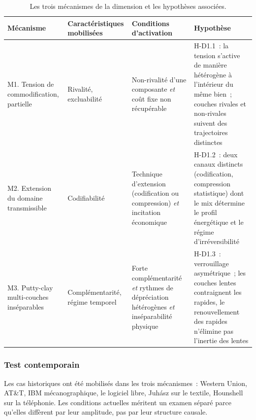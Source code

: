 \begin{table}[htbp]
\caption{Les trois mécanismes de la dimension et les hypothèses associées.}\label{tab:d1-mecanismes}
\centering\footnotesize
\renewcommand{\arraystretch}{1.25}
\begin{tabularx}{\textwidth}{@{}p{2.6cm}p{2.8cm}p{3.6cm}X@{}}
\toprule
\textbf{Mécanisme} & \textbf{Caractéristiques mobilisées} & \textbf{Conditions d'activation} & \textbf{Hypothèse} \\
\midrule
M1. Tension de commodification, partielle & Rivalité, excluabilité & Non-rivalité d'une composante \emph{et} coût fixe non récupérable & H-D1.1~: la tension s'active de manière hétérogène à l'intérieur du même bien~; couches rivales et non-rivales suivent des trajectoires distinctes \\
M2. Extension du domaine transmissible & Codifiabilité & Technique d'extension (codification ou compression) \emph{et} incitation économique & H-D1.2~: deux canaux distincts (codification, compression statistique) dont le mix détermine le profil énergétique et le régime d'irréversibilité \\
M3. Putty-clay multi-couches inséparables & Complémentarité, régime temporel & Forte complémentarité \emph{et} rythmes de dépréciation hétérogènes \emph{et} inséparabilité physique & H-D1.3~: verrouillage asymétrique~; les couches lentes contraignent les rapides, le renouvellement des rapides n'élimine pas l'inertie des lentes \\
\bottomrule
\end{tabularx}
\renewcommand{\arraystretch}{1.0}
\end{table}


\subsubsection{Test contemporain}

Les cas historiques ont été mobilisés dans les trois mécanismes~: Western Union, AT\&T, IBM mécanographique, le logiciel libre, Juhász sur le textile, Hounshell sur la téléphonie. Les conditions actuelles méritent un examen séparé parce qu'elles diffèrent par leur amplitude, pas par leur structure causale.

